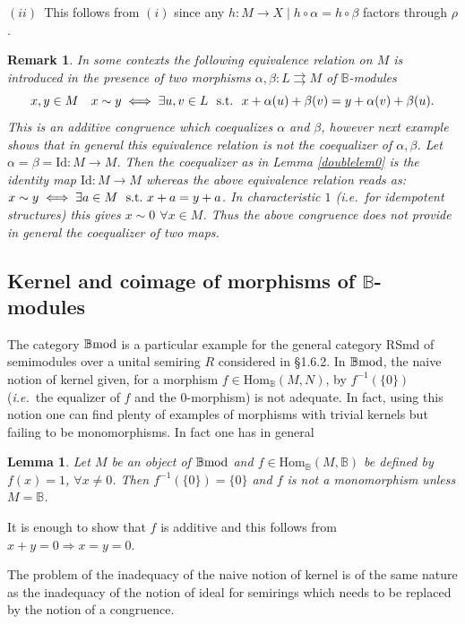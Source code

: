 \documentclass[12pt]{article}
\newtheorem{lem}[thm]{Lemma}
\newtheorem{rem}[thm]{Remark}
\def\Hom{{\rm Hom}}
\def\id{{\rm id}}
\def\B{{\mathbb B}}
\newcommand{\ie}{{\it i.e.\/}\ }
\def\id{{\mbox{Id}}}
\def\Hom {{\mbox{Hom}}}
\def\bmod{{\rm \B mod}}
\begin{document}
$(ii)$~This follows from $(i)$ since any $h:M\to X\mid h\circ \alpha=h\circ \beta$ factors through $\rho$.
\endproof
\begin{rem}\label{coequ}{\rm In some contexts the following equivalence relation on $M$ is introduced in the presence of two  morphisms $\alpha,\beta:L\rightrightarrows M$ of $\B$-modules
$$
x,y\in M\quad x\sim y\iff \exists u, v\in L~~{\rm s.t.}~     \ x+\alpha(u)+\beta(v)=y+\alpha(v)+\beta(u).
$$
This is an additive congruence which coequalizes $\alpha$ and $\beta$, however next example shows that in general this equivalence relation is not the coequalizer of $\alpha,\beta$. Let $\alpha=\beta=\id:M\to M$. Then the coequalizer as in Lemma \ref{doublelem0} is the identity map $\id:M\to M$ whereas the above equivalence relation reads as: $x\sim y\iff \exists a\in M~~{\rm s.t.}~ x+a=y+a$. In characteristic $1$ (\ie for idempotent structures) this gives $x\sim 0$ $\forall x\in M$. Thus the above congruence does not provide  in   general the coequalizer of two maps.
}\end{rem}


\subsection{Kernel  and coimage of morphisms of $\B$-modules}
The category $\bmod$  is a particular example for the general category RSmd of semimodules over a unital semiring $R$ considered in \cite{gra1} \S 1.6.2. In $\bmod$, the naive notion of kernel given, for  a morphism $f\in \Hom_\B(M,N)$, by $f^{-1}(\{0\})$ (\ie the equalizer of $f$ and the $0$-morphism) is not adequate. In fact, using this notion one can find plenty of examples of morphisms with trivial kernels but failing to be monomorphisms. In fact one has in general
\begin{lem}\label{maxform} Let $M$ be an object of $\bmod$ and $f\in \Hom_\B(M,\B)$ be defined by $f(x)=1$, $\forall x\neq 0$. Then $f^{-1}(\{0\})=\{0\}$ and $f$ is not a monomorphism unless $M=\B$.	
\end{lem}
\proof It is enough to show that $f$ is additive and this follows from $x+y=0\Rightarrow x=y=0$. \endproof 

The problem of the inadequacy of the naive notion of kernel is of the same nature as the inadequacy  
of the notion of ideal for semirings which needs to be replaced by the notion of a congruence. 
\end{document}
